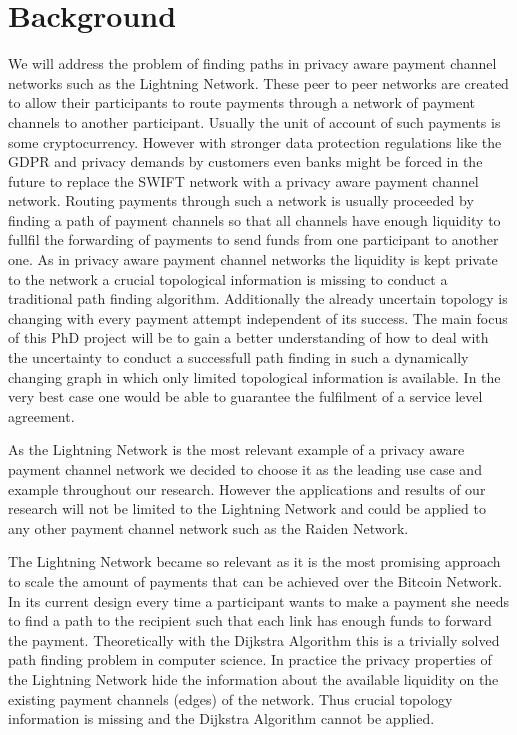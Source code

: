 \documentclass[a4paper]{paper}
\begin{document}
\section{Background}
We will address the problem of finding paths in privacy aware payment channel networks such as the Lightning Network.
These peer to peer networks are created to allow their participants to route payments through a network of payment channels to another participant.
Usually the unit of account of such payments is some cryptocurrency.
However with stronger data protection regulations like the GDPR and privacy demands by customers even banks might be forced in the future to replace the SWIFT network with a privacy aware payment channel network.
Routing payments through such a network is usually proceeded by finding a path of payment channels so that all channels have enough liquidity to fullfil the forwarding of payments to send funds from one participant to another one.
As in privacy aware payment channel networks the liquidity is kept private to the network a crucial topological information is missing to conduct a traditional path finding algorithm. 
Additionally the already uncertain topology is changing with every payment attempt independent of its success.
The main focus of this PhD project will be to gain a better understanding of how to deal with the uncertainty to conduct a successfull path finding in such a dynamically changing graph in which only limited topological information is available.
In the very best case one would be able to guarantee the fulfilment of a service level agreement.

As the Lightning Network is the most relevant example of a privacy aware payment channel network we decided to choose it as the leading use case and example throughout our research.
However the applications and results of our research will not be limited to the Lightning Network and could be applied to any other payment channel network such as the Raiden Network.

The Lightning Network became so relevant as it is the most promising approach to scale the amount of payments that can be achieved over the Bitcoin Network.
In its current design every time a participant wants to make a payment she needs to find a path to the recipient such that each link has enough funds to forward the payment.
Theoretically with the Dijkstra Algorithm this is a trivially solved path finding problem in computer science.
In practice the privacy properties of the Lightning Network hide the information about the available liquidity on the existing payment channels (edges) of the network.
Thus crucial topology information is missing and the Dijkstra Algorithm cannot be applied.
\end{document}
